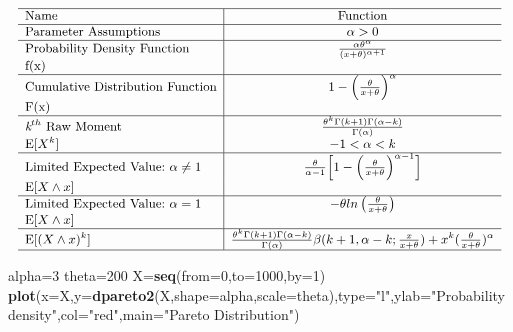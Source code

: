 \documentclass[]{book}
\newenvironment{Shaded}{\begin{snugshade}}{\end{snugshade}}
\newcommand{\KeywordTok}[1]{\textcolor[rgb]{0.13,0.29,0.53}{\textbf{#1}}}
\newcommand{\DataTypeTok}[1]{\textcolor[rgb]{0.13,0.29,0.53}{#1}}
\newcommand{\DecValTok}[1]{\textcolor[rgb]{0.00,0.00,0.81}{#1}}
\newcommand{\StringTok}[1]{\textcolor[rgb]{0.31,0.60,0.02}{#1}}
\newcommand{\NormalTok}[1]{#1}
\begin{document}
\[
{\small
\begin{matrix}
\begin{array}{l|c}
\hline
  \text{Name} & \text{Function} \\
\hline
  \text{Parameter Assumptions} & \alpha>0 \\
\hline
  \text{Probability Density Function} & \frac{\alpha\theta^\alpha}{(x+\theta)^{\alpha+1}} \\
    \text{f(x)} & \\
\hline
  \text{Cumulative Distribution Function} & 1-\Big(\frac{\theta}{x+\theta}\Big)^\alpha \\
    \text{F(x)} & \\
\hline
  \textit{k}^{th}~\text{Raw Moment} & \frac{\theta^k\Gamma(k+1)\Gamma(\alpha-k)}{\Gamma(\alpha)} \\
  \mathrm{E}[X^k] & -1<\alpha<k \\
\hline
  \text{Limited Expected Value:}~\alpha\neq1 & \frac{\theta}{\alpha-1}\Big[1-\Big(\frac{\theta}{x+\theta}\Big)^{\alpha-1}\Big] \\
  \mathrm{E}[X\wedge x] & \\
\hline
  \text{Limited Expected Value:}~\alpha=1 & -\theta ln\left(\frac{\theta}{x+\theta}\right) \\
  \mathrm{E}[X\wedge x] & \\
\hline
  \mathrm{E}[(X\wedge x)^k] & \frac{\theta^k\Gamma(k+1)\Gamma(\alpha-k)}{\Gamma(\alpha)}\beta(k+1,\alpha-k;\frac{x}{x+\theta})+x^k(\frac{\theta}{x+\theta})^\alpha  \\
\hline
\end{array}
\end{matrix}
}
\]

\begin{Shaded}
\begin{Highlighting}[]
\NormalTok{alpha=}\DecValTok{3}
\NormalTok{theta=}\DecValTok{200}
\NormalTok{X=}\KeywordTok{seq}\NormalTok{(}\DataTypeTok{from=}\DecValTok{0}\NormalTok{,}\DataTypeTok{to=}\DecValTok{1000}\NormalTok{,}\DataTypeTok{by=}\DecValTok{1}\NormalTok{)}
\KeywordTok{plot}\NormalTok{(}\DataTypeTok{x=}\NormalTok{X,}\DataTypeTok{y=}\KeywordTok{dpareto2}\NormalTok{(X,}\DataTypeTok{shape=}\NormalTok{alpha,}\DataTypeTok{scale=}\NormalTok{theta),}\DataTypeTok{type=}\StringTok{"l"}\NormalTok{,}\DataTypeTok{ylab=}\StringTok{"Probability density"}\NormalTok{,}\DataTypeTok{col=}\StringTok{"red"}\NormalTok{,}\DataTypeTok{main=}\StringTok{"Pareto Distribution"}\NormalTok{)}
\end{Highlighting}
\end{Shaded}
\end{document}
